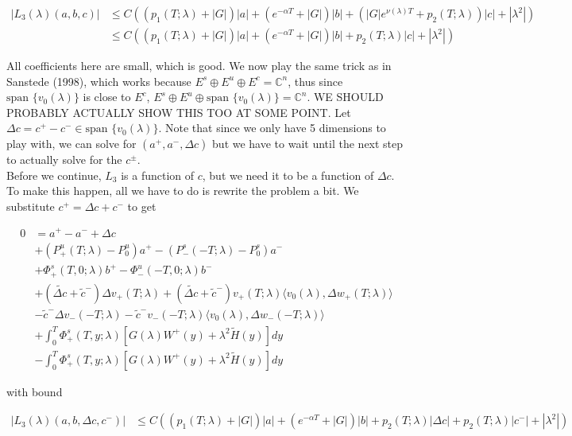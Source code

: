\documentclass[12pt]{article}
\def\C{{\mathbb C}}
\begin{document}
\begin{enumerate}
\begin{align*}
|L_3(\lambda)(a, b, c)| &\leq C ( (p_1(T; \lambda) + |G| ) |a|
+ (e^{-\alpha T} + |G|) |b| + (|G|e^{\nu(\lambda)T} + p_2(T; \lambda))|c| + |\lambda^2| )\\
&\leq C ( (p_1(T; \lambda) + |G| ) |a|
+ (e^{-\alpha T} + |G|) |b| + p_2(T; \lambda)|c| + |\lambda^2| )
\end{align*}

All coefficients here are small, which is good. We now play the same trick as in Sanstede (1998), which works because $E^s \oplus E^u \oplus E^c = \C^n$, thus since $\text{span }\{v_0(\lambda)\}$ is close to $E^c$, $E^s \oplus E^u \oplus \text{span }\{v_0(\lambda)\} = \C^n$. WE SHOULD PROBABLY ACTUALLY SHOW THIS TOO AT SOME POINT. Let $\Delta c = c^+ - c^- \in \text{span }\{v_0(\lambda)\}$. Note that since we only have 5 dimensions to play with, we can solve for $(a^+, a^-, \Delta c)$ but we have to wait until the next step to actually solve for the $c^\pm$.\\

Before we continue, $L_3$ is a function of $c$, but we need it to be a function of $\Delta c$. To make this happen, all we have to do is rewrite the problem a bit. We substitute $c^+ = \Delta c + c^-$ to get

\begin{align*}
0 &= a^+ - a^- + \Delta c \\
&+ (P^u_+(T; \lambda) - P_0^u)a^+ - (P^s_-(-T; \lambda) - P_0^s)a^- \\
&+ \Phi^s_+(T, 0; \lambda)b^+ - \Phi^u_-(-T, 0; \lambda)b^- \\
&+ (\tilde{\Delta c} + \tilde{c}^-) \Delta v_+(T; \lambda) + (\tilde{\Delta c} + \tilde{c}^-) v_+(T; \lambda) \langle v_0(\lambda), \Delta w_+(T; \lambda) \rangle \\
&- \tilde{c}^- \Delta v_-(-T; \lambda) - \tilde{c}^- v_-(-T; \lambda) \langle v_0(\lambda), \Delta w_-(-T; \lambda) \rangle \\
&+ \int_0^T \Phi^s_+(T, y; \lambda) [ G(\lambda)W^+(y) + \lambda^2 \tilde{H}(y) ] dy \\
&- \int_0^T \Phi^s_+(T, y; \lambda) [ G(\lambda)W^+(y) + \lambda^2 \tilde{H}(y) ] dy
\end{align*}

with bound

\begin{align*}
|L_3(\lambda)(a, b, \Delta c, c^-)| &\leq C ( (p_1(T; \lambda) + |G| ) |a|
+ (e^{-\alpha T} + |G|) |b| + p_2(T; \lambda)|\Delta c| + p_2(T; \lambda)|c^-| + |\lambda^2| )
\end{align*}


\end{enumerate}
\end{document}
